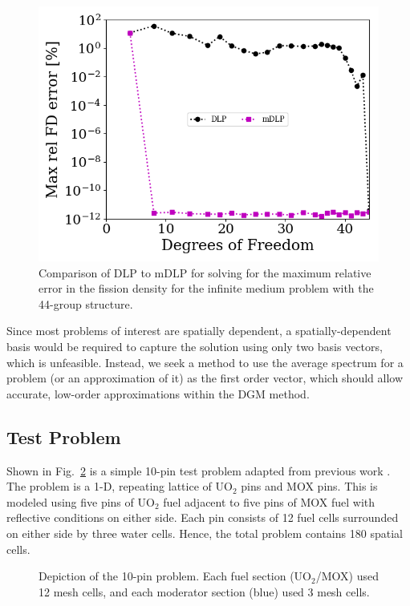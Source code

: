 \documentclass[5p,times,twocolumn,10pt]{elsarticle}
\newcommand{\FIG}[1]{Fig.~\ref{#1}}               %
\begin{document}
    \begin{figure}[htb]
        \includegraphics[scale=0.55]{figures/inf_max_fission_error_44}
        \caption{Comparison of DLP to mDLP for solving for the maximum relative error in the fission density for the infinite medium problem with the 44-group structure.}
        \label{fig:inf_med}
    \end{figure}

    Since most problems of interest are spatially dependent, a spatially-dependent basis would be required to capture the solution using only two basis vectors, which is unfeasible.
    Instead, we seek a method to use the average spectrum for a problem (or an approximation of it) as the first order vector, which should allow accurate, low-order approximations within the DGM method.

    \subsection{Test Problem}
    Shown in \FIG{fig:10-pin} is a simple 10-pin test problem adapted from previous work \cite{reed2015energy, reed2017application}.
    The problem is a 1-D, repeating lattice of UO$_2$ pins and MOX pins.
    This is modeled using five pins of UO$_2$ fuel adjacent to five pins of MOX fuel with reflective conditions on either side.
    Each pin consists of 12 fuel cells surrounded on either side by three water cells.
    Hence, the total problem contains 180 spatial cells.

    \begin{figure}[htb]
        
        \caption{Depiction of the 10-pin problem. Each fuel section (UO$_2$/MOX) used 12 mesh cells, and each moderator section (blue) used 3 mesh cells.}
        \label{fig:10-pin}
    \end{figure}
\end{document}
